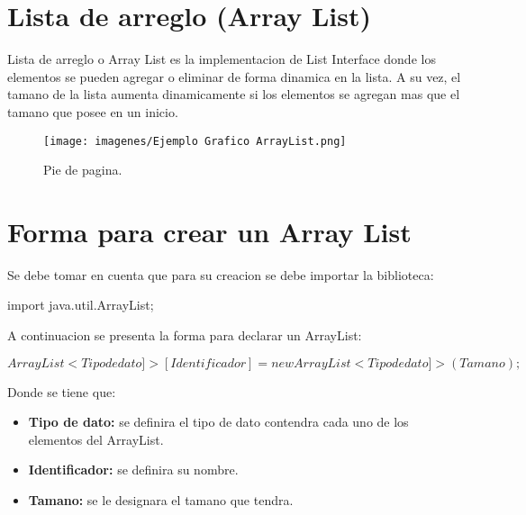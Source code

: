 \documentclass[12pt, letterpaper]{article} %
\begin{document}
\section*{Lista de arreglo (Array List)}
Lista de arreglo o Array List es la implementacion de List Interface donde los elementos se pueden agregar o eliminar de forma dinamica en la lista. A su vez, el tamano de la lista aumenta dinamicamente si los elementos se agregan mas que el tamano que posee en un inicio.

\begin{figure}[h]
    \centering
    \texttt{[image: imagenes/Ejemplo Grafico ArrayList.png]}
    \caption{Pie de pagina.}
    \label{fig:ejemploarraylist}
\end{figure}

\section*{Forma para crear un Array List}
Se debe tomar en cuenta que para su creacion se debe importar la biblioteca:

\begin{center}
    import java.util.ArrayList;
\end{center}

A continuacion se presenta la forma para declarar un ArrayList:
\begin{center}
    \(ArrayList<Tipo de dato]> [Identificador] = new ArrayList<Tipo de dato]>(Tamano);\)
\end{center}

Donde se tiene que:
\begin{itemize}
    \item \textbf{Tipo de dato:} se definira el tipo de dato contendra cada uno de los elementos del ArrayList.
    \item \textbf{Identificador:} se definira su nombre.
    \item \textbf{Tamano:} se le designara el tamano que tendra.
\end{itemize}
\end{document}
